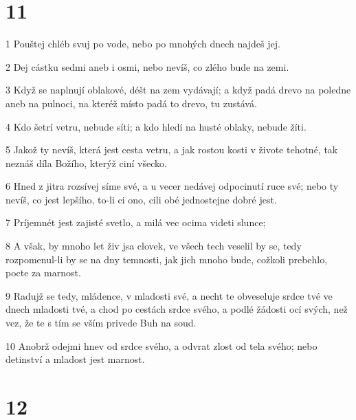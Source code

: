 \chapter{11}

\par 1 Pouštej chléb svuj po vode, nebo po mnohých dnech najdeš jej.
\par 2 Dej cástku sedmi aneb i osmi, nebo nevíš, co zlého bude na zemi.
\par 3 Když se naplnují oblakové, déšt na zem vydávají; a když padá drevo na poledne aneb na pulnoci, na kteréž místo padá to drevo, tu zustává.
\par 4 Kdo šetrí vetru, nebude síti; a kdo hledí na husté oblaky, nebude žíti.
\par 5 Jakož ty nevíš, která jest cesta vetru, a jak rostou kosti v živote tehotné, tak neznáš díla Božího, kterýž ciní všecko.
\par 6 Hned z jitra rozsívej síme své, a u vecer nedávej odpocinutí ruce své; nebo ty nevíš, co jest lepšího, to-li ci ono, cili obé jednostejne dobré jest.
\par 7 Príjemnét jest zajisté svetlo, a milá vec ocima videti slunce;
\par 8 A však, by mnoho let živ jsa clovek, ve všech tech veselil by se, tedy rozpomenul-li by se na dny temnosti, jak jich mnoho bude, cožkoli prebehlo, pocte za marnost.
\par 9 Radujž se tedy, mládence, v mladosti své, a necht te obveseluje srdce tvé ve dnech mladosti tvé, a chod po cestách srdce svého, a podlé žádosti ocí svých, než vez, že te s tím se vším privede Buh na soud.
\par 10 Anobrž odejmi hnev od srdce svého, a odvrat zlost od tela svého; nebo detinství a mladost jest marnost.

\chapter{12}

